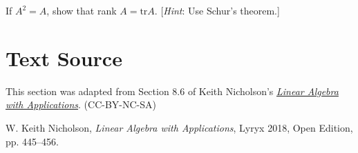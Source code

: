 \documentclass{ximera}
\begin{document}
\begin{problem}\label{prb:complex_matrices24}
If $A^{2} = A$, show that rank $A = \mbox{tr}A$. [\textit{Hint}: Use Schur's theorem.]
\end{problem}

\section*{Text Source} This section was adapted from Section 8.6 of Keith Nicholson's \href{https://open.umn.edu/opentextbooks/textbooks/linear-algebra-with-applications}{\it Linear Algebra with Applications}. (CC-BY-NC-SA)

W. Keith Nicholson, {\it Linear Algebra with Applications}, Lyryx 2018, Open Edition, pp. 445--456.
\end{document}
